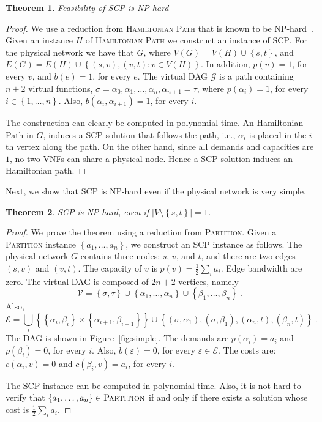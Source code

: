 \documentclass[11pt]{article}
\newtheorem{theorem}{Theorem}
\newcommand{\set}[1]{\left\{ #1 \right\}}
\newcommand{\abs}[1]{\left| #1 \right|}
\newcommand{\half}{\frac{1}{2}}
\newcommand{\eps}{\varepsilon}
\newcommand{\scp}{\textsc{SCP}\xspace}
\newcommand{\calE}{\mathcal{E}}
\newcommand{\calG}{\mathcal{G}}
\newcommand{\calV}{\mathcal{V}}
\begin{document}
\begin{theorem}
Feasibility of \scp is NP-hard
\end{theorem}
\begin{proof}
We use a reduction from \textsc{Hamiltonian Path} that is known to be
NP-hard~\cite{GarJoh79}.
%
Given an instance $H$ of \textsc{Hamiltonian Path} we construct an
instance of \scp.  For the physical network we have that $G$, where
$V(G) = V(H) \cup \set{s,t}$, and $E(G) = E(H) \cup \set{(s,v),(v,t) :
  v \in V(H)}$.  In addition, $p(v) = 1$, for every $v$, and $b(e) =
1$, for every $e$.  The virtual DAG $\calG$ is a path containing $n+2$
virtual functions, $\sigma = \alpha_0, \alpha_1, \ldots, \alpha_n,
\alpha_{n+1} = \tau$, where $p(\alpha_i) = 1$, for every $i \in
\set{1,\ldots,n}$.  Also, $b(\alpha_i,\alpha_{i+1}) = 1$, for every
$i$.

The construction can clearly be computed in polynomial time.
%
An Hamiltonian Path in $G$, induces a \scp solution that follows the
path, i.e., $\alpha_i$ is placed in the $i$th vertex along the path.
%
On the other hand, since all demands and capacities are $1$, no two
VNFs can share a physical node.  Hence a \scp solution induces an
Hamiltonian path.
\end{proof}

Next, we show that \scp is NP-hard even if the physical network is
very simple. 

\begin{theorem}
\label{thm:simple}
\scp is NP-hard, even if $\abs{V \setminus \set{s,t}} = 1$.
\end{theorem}
\begin{proof}
We prove the theorem using a reduction from \textsc{Partition}.
Given a \textsc{Partition} instance $\set{a_1, \ldots, a_n}$, we
construct an \scp instance as follows.
%
The physical network $G$ contains three nodes: $s$, $v$, and $t$, and
there are two edges $(s,v)$ and $(v,t)$.  The capacity of $v$ is $p(v)
= \half \sum_i a_i$.  Edge bandwidth are zero.
%
The virtual DAG is composed of $2n+2$ vertices, namely
\[
\calV
= \set{\sigma,\tau}
  \cup \set{\alpha_1, \ldots, \alpha_n}
  \cup \set{\beta_1, \ldots, \beta_n}
~.
\]
Also,
\[
\calE
= \bigcup_i \set{ \set{\alpha_i,\beta_i} \times \set{\alpha_{i+1},\beta_{i+1}} } 
  \cup
  \set{ (\sigma,\alpha_1), (\sigma,\beta_1), (\alpha_n,t), (\beta_n,t) }
~.
\]
The DAG is shown in Figure~\ref{fig:simple}.
%
The demands are $p(\alpha_i) = a_i$ and $p(\beta_i) = 0$, for every
$i$.  Also, $b(\eps) = 0$, for every $\eps \in \calE$.  The costs are:
$c(\alpha_i,v) = 0$ and $c(\beta_i,v) = a_i$, for every $i$.

The \scp instance can be computed in polynomial time.
%
Also, it is not hard to verify that $\set{a_1, \ldots, a_n} \in
\textsc{Partition}$ if and only if there exists a solution whose cost
is $\half \sum_i a_i$.
\end{proof}
\end{document}
